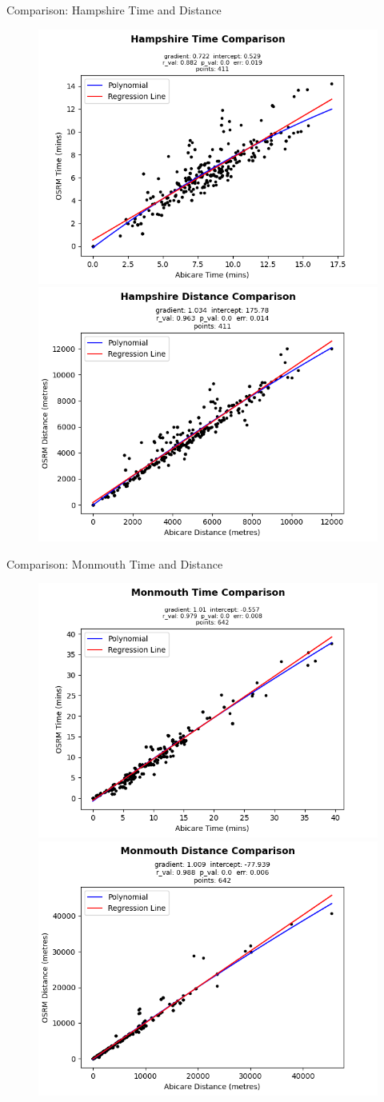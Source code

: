 \documentclass[usenames,dvipsnames]{beamer}
\begin{document}
\begin{frame}{Comparison: Hampshire Time and Distance}
	\begin{figure}
		\includegraphics[width=0.5\linewidth]{figures/Hampshire_time_comparison_abi}%
		\includegraphics[width=0.5\linewidth]{figures/Hampshire_dist_comparison_abi}
	\end{figure}
\end{frame}

\begin{frame}{Comparison: Monmouth Time and Distance}
	\begin{figure}
		\includegraphics[width=0.5\linewidth]{figures/Monmouth_time_comparison_abi}%
		\includegraphics[width=0.5\linewidth]{figures/Monmouth_dist_comparison_abi}
	\end{figure}
\end{frame}
\end{document}
